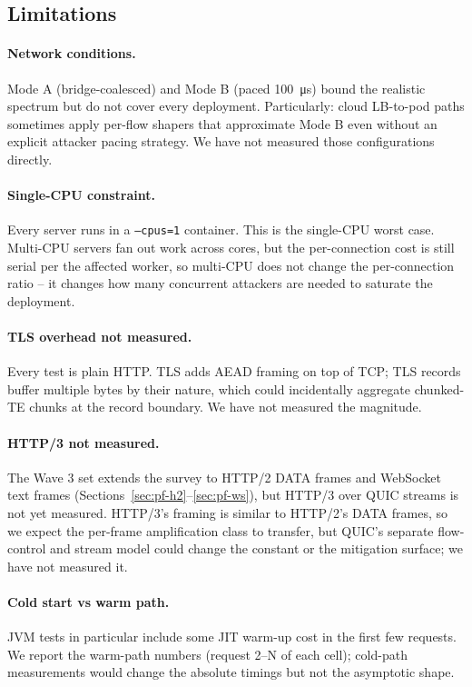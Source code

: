\subsection{Limitations}
\label{sec:future-limit}

\paragraph{Network conditions.}
Mode A (bridge-coalesced) and Mode B (paced \SI{100}{\micro\second})
bound the realistic spectrum but do not cover every deployment.
Particularly: cloud LB-to-pod paths sometimes apply per-flow
shapers that approximate Mode B even without an explicit attacker
pacing strategy. We have not measured those configurations
directly.

\paragraph{Single-CPU constraint.}
Every server runs in a \texttt{--cpus=1} container. This is the
single-CPU worst case. Multi-CPU servers fan out work across cores,
but the per-connection cost is still serial per the affected
worker, so multi-CPU does not change the per-connection ratio --
it changes how many concurrent attackers are needed to saturate
the deployment.

\paragraph{TLS overhead not measured.}
Every test is plain HTTP. TLS adds AEAD framing on top of TCP;
TLS records buffer multiple bytes by their nature, which could
incidentally aggregate chunked-TE chunks at the record boundary.
We have not measured the magnitude.

\paragraph{HTTP/3 not measured.}
The Wave 3 set extends the survey to HTTP/2 DATA frames and
WebSocket text frames (Sections~\ref{sec:pf-h2}--\ref{sec:pf-ws}),
but HTTP/3 over QUIC streams is not yet measured. HTTP/3's framing
is similar to HTTP/2's DATA frames, so we expect the per-frame
amplification class to transfer, but QUIC's separate flow-control
and stream model could change the constant or the mitigation
surface; we have not measured it.

\paragraph{Cold start vs warm path.}
JVM tests in particular include some JIT warm-up cost in the
first few requests. We report the warm-path numbers (request
2--N of each cell); cold-path measurements would change the
absolute timings but not the asymptotic shape.

